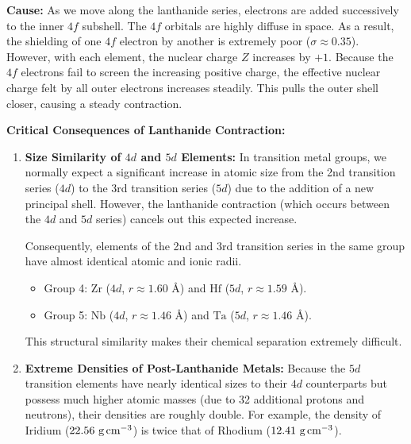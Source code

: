 \documentclass[12pt,a4paper]{article}
\begin{document}
\textbf{Cause:}
As we move along the lanthanide series, electrons are added successively to the inner $4f$ subshell. The $4f$ orbitals are highly diffuse in space. As a result, the shielding of one $4f$ electron by another is extremely poor ($\sigma \approx 0.35$). However, with each element, the nuclear charge $Z$ increases by $+1$. Because the $4f$ electrons fail to screen the increasing positive charge, the effective nuclear charge felt by all outer electrons increases steadily. This pulls the outer shell closer, causing a steady contraction.

\textbf{Critical Consequences of Lanthanide Contraction:}
\begin{enumerate}
  \item \textbf{Size Similarity of $4d$ and $5d$ Elements:} In transition metal groups, we normally expect a significant increase in atomic size from the 2nd transition series ($4d$) to the 3rd transition series ($5d$) due to the addition of a new principal shell. However, the lanthanide contraction (which occurs between the $4d$ and $5d$ series) cancels out this expected increase.
    \par
    Consequently, elements of the 2nd and 3rd transition series in the same group have almost identical atomic and ionic radii.
    \begin{itemize}
      \item Group 4: $\text{Zr}$ ($4d$, $r \approx 1.60\text{ \AA}$) and $\text{Hf}$ ($5d$, $r \approx 1.59\text{ \AA}$).
      \item Group 5: $\text{Nb}$ ($4d$, $r \approx 1.46\text{ \AA}$) and $\text{Ta}$ ($5d$, $r \approx 1.46\text{ \AA}$).
    \end{itemize}
    This structural similarity makes their chemical separation extremely difficult.
  \item \textbf{Extreme Densities of Post-Lanthanide Metals:} Because the $5d$ transition elements have nearly identical sizes to their $4d$ counterparts but possess much higher atomic masses (due to 32 additional protons and neutrons), their densities are roughly double. For example, the density of Iridium ($22.56\ \text{g\,cm}^{-3}$) is twice that of Rhodium ($12.41\ \text{g\,cm}^{-3}$).
\end{enumerate}
\end{document}
